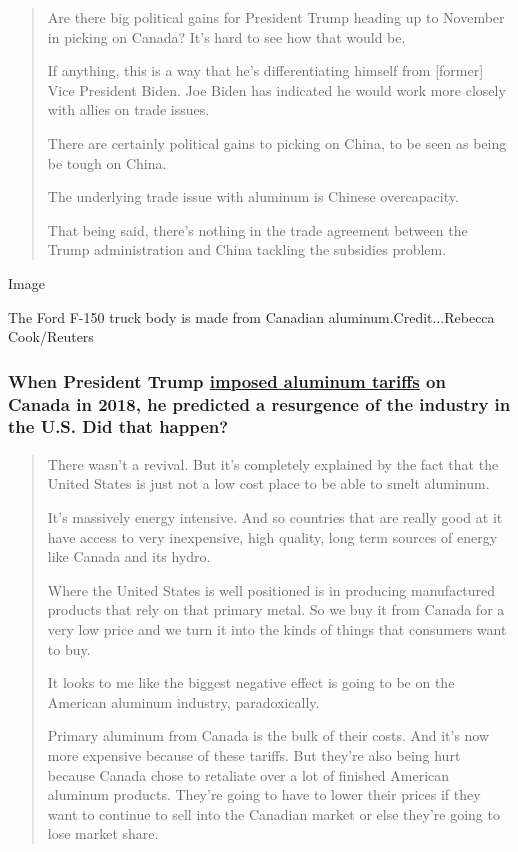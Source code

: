 \begin{quote}
Are there big political gains for President Trump heading up to November
in picking on Canada? It's hard to see how that would be.

If anything, this is a way that he's differentiating himself from
{[}former{]} Vice President Biden. Joe Biden has indicated he would work
more closely with allies on trade issues.

There are certainly political gains to picking on China, to be seen as
being be tough on China.

The underlying trade issue with aluminum is Chinese overcapacity.

That being said, there's nothing in the trade agreement between the
Trump administration and China tackling the subsidies problem.
\end{quote}

Image

The Ford F-150 truck body is made from Canadian
aluminum.Credit...Rebecca Cook/Reuters

\hypertarget{when-president-trump-imposed-aluminum-tariffs-on-canada-in-2018-he-predicted-a-resurgence-of-the-industry-in-the-us-did-that-happen}{%
\subsubsection{\texorpdfstring{When President Trump
\href{https://www.nytimes3xbfgragh.onion/2018/05/31/us/politics/trump-aluminum-steel-tariffs.html}{imposed
aluminum tariffs} on Canada in 2018, he predicted a resurgence of the
industry in the U.S. Did that
happen?}{When President Trump imposed aluminum tariffs on Canada in 2018, he predicted a resurgence of the industry in the U.S. Did that happen?}}\label{when-president-trump-imposed-aluminum-tariffs-on-canada-in-2018-he-predicted-a-resurgence-of-the-industry-in-the-us-did-that-happen}}

\begin{quote}
There wasn't a revival. But it's completely explained by the fact that
the United States is just not a low cost place to be able to smelt
aluminum.

It's massively energy intensive. And so countries that are really good
at it have access to very inexpensive, high quality, long term sources
of energy like Canada and its hydro.

Where the United States is well positioned is in producing manufactured
products that rely on that primary metal. So we buy it from Canada for a
very low price and we turn it into the kinds of things that consumers
want to buy.

It looks to me like the biggest negative effect is going to be on the
American aluminum industry, paradoxically.

Primary aluminum from Canada is the bulk of their costs. And it's now
more expensive because of these tariffs. But they're also being hurt
because Canada chose to retaliate over a lot of finished American
aluminum products. They're going to have to lower their prices if they
want to continue to sell into the Canadian market or else they're going
to lose market share.
\end{quote}


